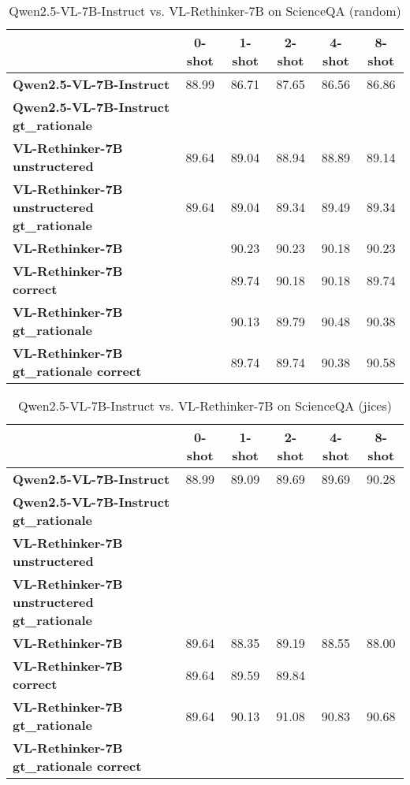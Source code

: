 \begin{table}
\caption{Qwen2.5-VL-7B-Instruct vs. VL-Rethinker-7B on ScienceQA (random)}
\label{tab:Qwen2.5-VL-7B-Instruct_ScienceQA_TRAIN_random}
\begin{tabular}{lccccc}
\toprule
 & 0-shot & 1-shot & 2-shot & 4-shot & 8-shot \\
\midrule
\textbf{Qwen2.5-VL-7B-Instruct} & 88.99 & 86.71 & 87.65 & 86.56 & 86.86 \\
\textbf{Qwen2.5-VL-7B-Instruct gt\_rationale} &  &  &  &  &  \\
\textbf{VL-Rethinker-7B unstructered} & 89.64 & 89.04 & 88.94 & 88.89 & 89.14 \\
\textbf{VL-Rethinker-7B unstructered gt\_rationale} & 89.64 & 89.04 & 89.34 & 89.49 & 89.34 \\
\textbf{VL-Rethinker-7B} &  & 90.23 & 90.23 & 90.18 & 90.23 \\
\textbf{VL-Rethinker-7B correct} &  & 89.74 & 90.18 & 90.18 & 89.74 \\
\textbf{VL-Rethinker-7B gt\_rationale} &  & 90.13 & 89.79 & 90.48 & 90.38 \\
\textbf{VL-Rethinker-7B gt\_rationale correct} &  & 89.74 & 89.74 & 90.38 & 90.58 \\
\bottomrule
\end{tabular}
\end{table}


\begin{table}
\caption{Qwen2.5-VL-7B-Instruct vs. VL-Rethinker-7B on ScienceQA (jices)}
\label{tab:Qwen2.5-VL-7B-Instruct_ScienceQA_TRAIN_jices}
\begin{tabular}{lccccc}
\toprule
 & 0-shot & 1-shot & 2-shot & 4-shot & 8-shot \\
\midrule
\textbf{Qwen2.5-VL-7B-Instruct} & 88.99 & 89.09 & 89.69 & 89.69 & 90.28 \\
\textbf{Qwen2.5-VL-7B-Instruct gt\_rationale} &  &  &  &  &  \\
\textbf{VL-Rethinker-7B unstructered} &  &  &  &  &  \\
\textbf{VL-Rethinker-7B unstructered gt\_rationale} &  &  &  &  &  \\
\textbf{VL-Rethinker-7B} & 89.64 & 88.35 & 89.19 & 88.55 & 88.00 \\
\textbf{VL-Rethinker-7B correct} & 89.64 & 89.59 & 89.84 &  &  \\
\textbf{VL-Rethinker-7B gt\_rationale} & 89.64 & 90.13 & 91.08 & 90.83 & 90.68 \\
\textbf{VL-Rethinker-7B gt\_rationale correct} &  &  &  &  &  \\
\bottomrule
\end{tabular}
\end{table}


